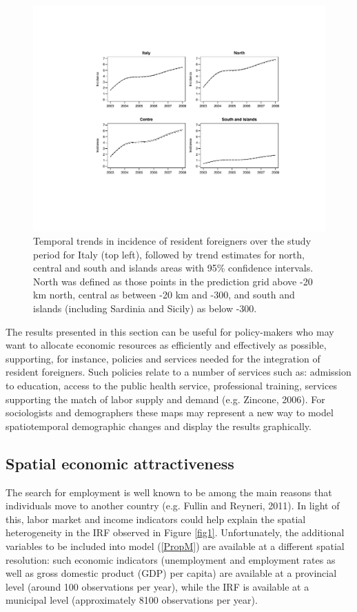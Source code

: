 \begin{figure}[tbp]
	\centering
		\includegraphics[width=\textwidth]{it/trends.pdf}
	\caption{Temporal trends in incidence of resident foreigners over the study period for Italy (top left), followed by trend estimates for north, central and south and islands areas with 95\% confidence intervals. North was defined as those points in the prediction grid above -20 km north, central as between -20 km and -300, and south and islands (including Sardinia and Sicily) as below -300.}
	\label{trends}
\end{figure}

The results presented in this section can be useful for policy-makers who may want to allocate economic resources as efficiently and effectively as possible, supporting, for instance, policies and services needed for the integration of resident foreigners. Such policies relate to a number of services such as: admission to education, access to the public health service, professional training, services supporting the match of labor supply and demand (e.g. Zincone, 2006). For sociologists and demographers these maps may represent a new way to model spatiotemporal demographic changes and display the results graphically. 

\subsection{Spatial economic attractiveness \label{diss}}

The search for employment is well known to be among the main reasons that individuals move to another country (e.g. Fullin and Reyneri, 2011). In light of this, labor market and income indicators could help explain the spatial heterogeneity in the IRF observed in Figure \ref{fig1}. Unfortunately, the additional variables to be included into model (\ref{PropM}) are available at a different spatial resolution: such economic indicators (unemployment and employment rates as well as gross domestic product (GDP) per capita) are available at a provincial level (around 100 observations per year), while the IRF is available at a municipal level (approximately 8100 observations per year). 

